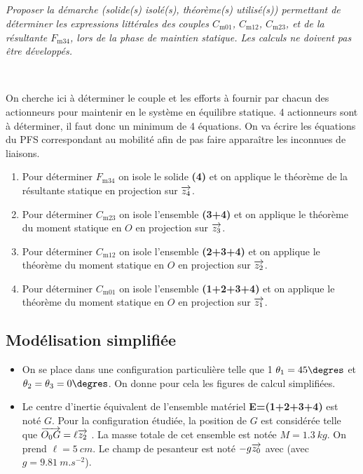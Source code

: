 \documentclass[10pt,fleqn]{article} %
\begin{document}
\begin{multicols}{2}
\begin{corrige}
\end{corrige}
\else
\fi
\subparagraph{}
\textit{Proposer la démarche (solide(s) isolé(s), théorème(s) utilisé(s)) permettant de déterminer les expressions littérales des couples $C_{\text{m01}}$, $C_{\text{m12}}$, $C_{\text{m23}}$,  et de la résultante $F_{\text{m34}}$,  lors de la phase de
maintien statique. Les calculs ne doivent pas être développés.}
\ifprof
\begin{corrige} ~\\

\begin{methode}
On cherche ici à déterminer le couple et les efforts à fournir par chacun des actionneurs pour maintenir en le système en équilibre statique. 4 actionneurs sont à déterminer, il faut donc un minimum de 4 équations. On va écrire les équations du PFS correspondant au mobilité afin de pas faire apparaître les inconnues de liaisons.   
\end{methode}

\begin{enumerate}
\item Pour déterminer $F_{\text{m34}}$ on isole le solide \textbf{(4)} et on applique le théorème de la résultante statique en projection sur $\overrightarrow{z_4}$.
\item Pour déterminer $C_{\text{m23}}$ on isole l'ensemble \textbf{(3+4)} et on applique le théorème du moment statique en $O$ en projection sur $\overrightarrow{z_3}$.
\item Pour déterminer $C_{\text{m12}}$ on isole l'ensemble \textbf{(2+3+4)} et on applique le théorème du moment statique en $O$ en projection sur $\overrightarrow{z_2}$.
\item Pour déterminer $C_{\text{m01}}$ on  isole l'ensemble \textbf{(1+2+3+4)} et on applique le théorème du moment statique en $O$ en projection sur $\overrightarrow{z_1}$.
\end{enumerate}
\end{corrige}
\else
\fi

 
 \subsection*{Modélisation simplifiée}
 
 \ifprof
 \else
\begin{itemize}
\item On se place dans une configuration particulière telle que 1 $\theta_1=45\degres$ et $\theta_2=\theta_3=0\degres$. On donne pour cela les figures de calcul simplifiées.
\item Le centre d’inertie équivalent de l’ensemble matériel \textbf{E=(1+2+3+4)} est noté $G$.
Pour la configuration étudiée, la position de $G$ est considérée telle que $\overrightarrow{O_0G}=\ell\overrightarrow{z_2}$ . La masse totale de cet ensemble est notée $M=\SI{1,3}{kg}$. On prend $\ell=\SI{5}{cm}$. Le champ de pesanteur est noté $-g\overrightarrow{z_0}$ avec (avec $g=\SI{9,81}{m.s^{-2}}$).
\end{itemize}



\end{multicols}
\end{document}
